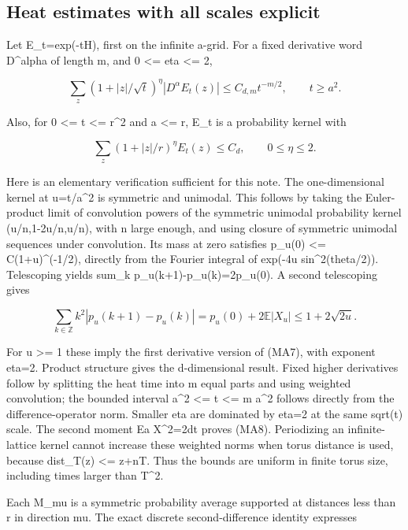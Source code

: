 \documentclass[
  11pt,
]{article}
\begin{document}
\hypertarget{heat-estimates-with-all-scales-explicit}{%
\subsection{Heat estimates with all scales
explicit}\label{heat-estimates-with-all-scales-explicit}}

Let E\_t=exp(-tH), first on the infinite a-grid. For a fixed derivative
word D\^{}alpha of length m, and 0 \textless= eta \textless= 2,

\[
\sum_z(1+|z|/\sqrt t)^\eta
 |D^\alpha E_t(z)|\le C_{d,m}t^{-m/2},\qquad t\ge a^2.
\tag{MA7}
\]

Also, for 0 \textless= t \textless= r\^{}2 and a \textless= r, E\_t is a
probability kernel with

\[
\sum_z(1+|z|/r)^\eta E_t(z)\le C_d,\qquad 0\le\eta\le2.
\tag{MA8}
\]

Here is an elementary verification sufficient for this note. The
one-dimensional kernel at u=t/a\^{}2 is symmetric and unimodal. This
follows by taking the Euler-product limit of convolution powers of the
symmetric unimodal probability kernel (u/n,1-2u/n,u/n), with n large
enough, and using closure of symmetric unimodal sequences under
convolution. Its mass at zero satisfies p\_u(0) \textless=
C(1+u)\^{}(-1/2), directly from the Fourier integral of exp(-4u
sin\^{}2(theta/2)). Telescoping yields sum\_k
\textbar p\_u(k+1)-p\_u(k)\textbar=2p\_u(0). A second telescoping gives

\[
\sum_{k\in\mathbb Z}k^2|p_u(k+1)-p_u(k)|
=p_u(0)+2\mathbb E|X_u|
\le1+2\sqrt{2u}.
\]

For u \textgreater= 1 these imply the first derivative version of (MA7),
with exponent eta=2. Product structure gives the d-dimensional result.
Fixed higher derivatives follow by splitting the heat time into m equal
parts and using weighted convolution; the bounded interval a\^{}2
\textless= t \textless= m a\^{}2 follows directly from the
difference-operator norm. Smaller eta are dominated by eta=2 at the same
sqrt(t) scale. The second moment E\textbar a X\textbar\^{}2=2dt proves
(MA8). Periodizing an infinite-lattice kernel cannot increase these
weighted norms when torus distance is used, because dist\_T(z)
\textless= \textbar z+nT\textbar. Thus the bounds are uniform in finite
torus size, including times larger than T\^{}2.

Each M\_mu is a symmetric probability average supported at distances
less than r in direction mu. The exact discrete second-difference
identity expresses
\end{document}

